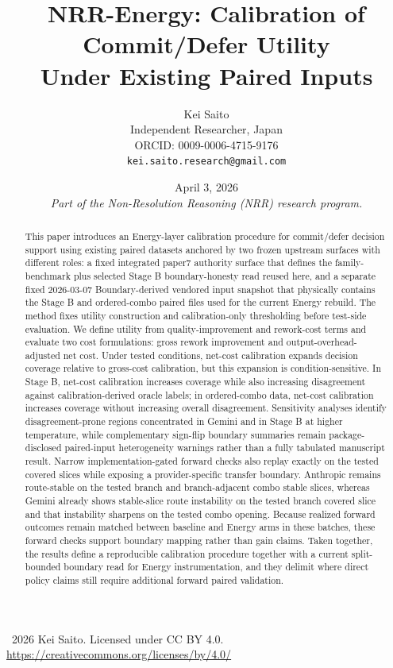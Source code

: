 \documentclass[11pt,a4paper]{article}
\title{\textbf{NRR-Energy: Calibration of Commit/Defer Utility\\Under Existing Paired Inputs}}
\author{
  Kei Saito \\
  Independent Researcher, Japan \\
  ORCID: 0009-0006-4715-9176 \\
  \texttt{kei.saito.research@gmail.com}
}
\date{April 3, 2026 \\[0.5em]
\textit{Part of the Non-Resolution Reasoning (NRR) research program.}}
\begin{document}
\maketitle

\begin{center}
\textcopyright\ 2026 Kei Saito.
Licensed under CC BY 4.0.\\
\url{https://creativecommons.org/licenses/by/4.0/}
\end{center}

\begin{abstract}
This paper introduces an Energy-layer calibration procedure for commit/defer decision support using existing paired datasets anchored by two frozen upstream surfaces with different roles: a fixed integrated paper7 authority surface that defines the family-benchmark plus selected Stage B boundary-honesty read reused here, and a separate fixed 2026-03-07 Boundary-derived vendored input snapshot that physically contains the Stage B and ordered-combo paired files used for the current Energy rebuild. The method fixes utility construction and calibration-only thresholding before test-side evaluation. We define utility from quality-improvement and rework-cost terms and evaluate two cost formulations: gross rework improvement and output-overhead-adjusted net cost. Under tested conditions, net-cost calibration expands decision coverage relative to gross-cost calibration, but this expansion is condition-sensitive. In Stage B, net-cost calibration increases coverage while also increasing disagreement against calibration-derived oracle labels; in ordered-combo data, net-cost calibration increases coverage without increasing overall disagreement. Sensitivity analyses identify disagreement-prone regions concentrated in Gemini and in Stage B at higher temperature, while complementary sign-flip boundary summaries remain package-disclosed paired-input heterogeneity warnings rather than a fully tabulated manuscript result. Narrow implementation-gated forward checks also replay exactly on the tested covered slices while exposing a provider-specific transfer boundary. Anthropic remains route-stable on the tested branch and branch-adjacent combo stable slices, whereas Gemini already shows stable-slice route instability on the tested branch covered slice and that instability sharpens on the tested combo opening. Because realized forward outcomes remain matched between baseline and Energy arms in these batches, these forward checks support boundary mapping rather than gain claims. Taken together, the results define a reproducible calibration procedure together with a current split-bounded boundary read for Energy instrumentation, and they delimit where direct policy claims still require additional forward paired validation.
\end{abstract}
\end{document}

